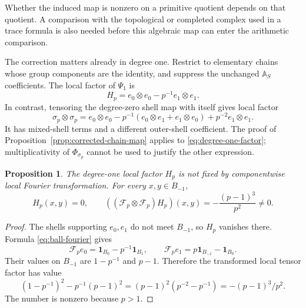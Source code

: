 \documentclass[11pt,letterpaper]{article}
\newtheorem{proposition}[theorem]{Proposition}
\theoremstyle{definition}
\theoremstyle{remark}
\newcommand{\ind}{\mathbf1}
\begin{document}
Whether the induced map is nonzero on a primitive quotient
depends on that quotient. A comparison with the topological
or completed complex used in a trace formula is also needed
before this algebraic map can enter the arithmetic comparison.

The correction matters already in degree one. Restrict
to elementary chains whose group components are the identity,
and suppress the unchanged $\mathbb A_S$ coefficients.
The local factor of $\Psi_1$ is
\begin{equation}\label{eq:degree-one-factor}
 H_p=e_0\otimes e_0-p^{-1}e_1\otimes e_1.
\end{equation}
In contrast, tensoring the degree-zero shell map with
itself gives local factor
\begin{equation}\label{eq:naive-degree-one}
 \sigma_p\otimes\sigma_p
 =e_0\otimes e_0-p^{-1}(e_0\otimes e_1+e_1\otimes e_0)
      +p^{-2}e_1\otimes e_1.
\end{equation}
It has mixed-shell terms and a different outer-shell
coefficient. The proof of
Proposition~\ref{prop:corrected-chain-map} applies to
\eqref{eq:degree-one-factor}; multiplicativity of
$\Phi_{\sigma_p}$ cannot be used to justify the other
expression.

\begin{proposition}\label{prop:chain-Fourier-defect}
The degree-one local factor $H_p$ is not fixed by
componentwise local Fourier transformation. For every
$x,y\in B_{-1}$,
\begin{equation}\label{eq:chain-Fourier-defect}
 H_p(x,y)=0,\qquad
 ((\mathscr F_p\otimes\mathscr F_p)H_p)(x,y)
       =-\frac{(p-1)^3}{p^2}\ne0.
\end{equation}
\end{proposition}

\begin{proof}
The shells supporting $e_0,e_1$ do not meet $B_{-1}$,
so $H_p$ vanishes there. Formula \eqref{eq:ball-fourier}
gives
\begin{equation}\label{eq:shell-transform-pair}
 \mathscr F_pe_0=\ind_{B_0}-p^{-1}\ind_{B_1},\qquad
 \mathscr F_pe_1=p\ind_{B_{-1}}-\ind_{B_0}.
\end{equation}
Their values on $B_{-1}$ are $1-p^{-1}$ and $p-1$.
Therefore the transformed local tensor factor has value
\begin{equation}\label{eq:chain-Fourier-value}
 (1-p^{-1})^2-p^{-1}(p-1)^2
    =(p-1)^2(p^{-2}-p^{-1})
    =-(p-1)^3/p^2.
\end{equation}
The number is nonzero because $p>1$.
\end{proof}
\end{document}
